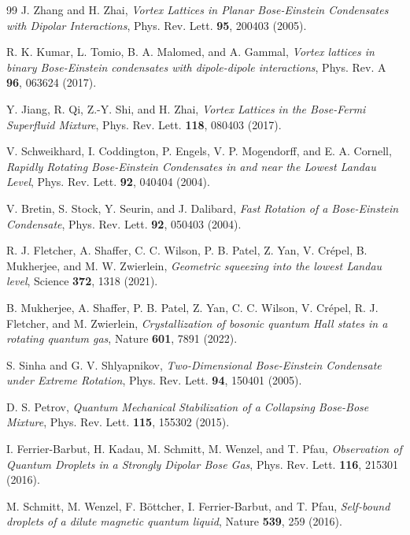 \documentclass[reprint,aps,prl,twocolumn,superscriptaddress]{revtex4-1}
\begin{document}
\begin{thebibliography}{99}
 J. Zhang and H. Zhai, \textit{Vortex Lattices in Planar Bose-Einstein Condensates with Dipolar Interactions}, {Phys. Rev. Lett. {\bf 95}, 200403 (2005)}.

 R. K. Kumar, L. Tomio, B. A. Malomed, and A. Gammal, \textit{Vortex lattices in binary Bose-Einstein condensates with dipole-dipole interactions}, {Phys. Rev. A {\bf 96}, 063624 (2017)}.

 Y. Jiang, R. Qi, Z.-Y. Shi, and H. Zhai, \textit{Vortex Lattices in the Bose-Fermi Superfluid Mixture}, {Phys. Rev. Lett. {\bf 118}, 080403 (2017)}.



  V. Schweikhard, I. Coddington, P. Engels, V. P. Mogendorff, and E. A. Cornell, \textit{Rapidly Rotating Bose-Einstein Condensates in and near the Lowest Landau Level}, {Phys. Rev. Lett. {\bf 92}, 040404 (2004)}.

 V. Bretin, S. Stock, Y. Seurin, and J. Dalibard, \textit{Fast Rotation of a Bose-Einstein Condensate},  {Phys. Rev. Lett. {\bf 92}, 050403 (2004)}.

 
  R. J. Fletcher, A. Shaffer, C. C. Wilson, P. B. Patel, Z. Yan, V. Crépel, B. Mukherjee, and M. W. Zwierlein, \textit{Geometric squeezing into the lowest Landau level},  {Science {\bf 372}, 1318 (2021)}.

 
  B. Mukherjee, A. Shaffer, P. B. Patel, Z. Yan, C. C. Wilson, V. Crépel, R. J. Fletcher, and M. Zwierlein, \textit{Crystallization of bosonic quantum Hall states in a rotating quantum gas},  {Nature {\bf 601}, 7891 (2022)}.

 
  S. Sinha and G. V. Shlyapnikov, \textit{Two-Dimensional Bose-Einstein Condensate under Extreme Rotation}, {Phys. Rev. Lett. {\bf 94}, 150401 (2005)}.


 D. S. Petrov, \textit{Quantum Mechanical Stabilization of a Collapsing Bose-Bose Mixture},  {Phys. Rev. Lett. {\bf 115}, 155302 (2015)}.



 I. Ferrier-Barbut, H. Kadau, M. Schmitt, M. Wenzel, and T. Pfau, \textit{Observation of Quantum Droplets in a Strongly Dipolar Bose Gas}, Phys. Rev. Lett. {\bf 116}, 215301 (2016).

 M. Schmitt, M. Wenzel, F. B{\"o}ttcher, I. Ferrier-Barbut, and T. Pfau, \textit{Self-bound droplets of a dilute magnetic quantum liquid}, Nature {\bf 539}, 259 (2016).


\end{thebibliography}
\end{document}
